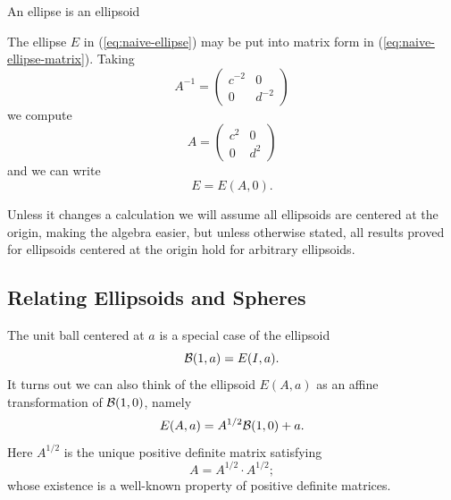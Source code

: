 \begin{examplebox}{An ellipse is an ellipsoid}
  \begin{example}
    The ellipse \(E\) in (\ref{eq:naive-ellipse}) may be put into matrix form
    in (\ref{eq:naive-ellipse-matrix}). Taking
    \[A^{-1} = \left(\begin{matrix} c^{-2} & 0\\ 0 & d^{-2} \end{matrix}\right)\]
    we compute
    \[A = \left(\begin{matrix} c^2 & 0\\ 0 & d^{2} \end{matrix}\right)\]
    and we can write
    \[E = E(A, 0).\]
  \end{example}
\end{examplebox}

Unless it changes a calculation we will assume all ellipsoids are centered at
the origin, making the algebra easier,  but unless otherwise stated, all results
proved for ellipsoids centered at the origin hold for arbitrary ellipsoids.


\subsection{Relating Ellipsoids and Spheres}
The unit ball centered at \(a\) is a special case of the ellipsoid
\[\mathcal{B}(1, a) = E(I, a).\]
It turns out we can also think of the ellipsoid \(E(A, a)\) as an affine
transformation of \(\mathcal{B}(1,0)\), namely
%
\[E(A,a) = A^{1/2} \mathcal{B}(1, 0) + a.\]
%
Here \(A^{1/2}\) is the unique positive definite matrix satisfying
\[A = A^{1/2} \cdot A^{1/2};\]
whose existence is a well-known property of positive definite matrices.

